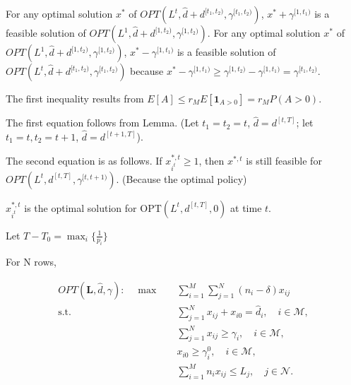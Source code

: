 For any optimal solution $x^{*}$ of $OPT(L^{t}, \hat{d}+d^{[t_1, t_2)}, \gamma^{[t_1, t_2)})$, $x^{*} + \gamma^{[1, t_1)}$ is a feasible solution of $OPT(L^{1}, \hat{d}+d^{[1, t_2)}, \gamma^{[1, t_2)})$. For any optimal solution $x^{*}$ of $OPT(L^{1}, \hat{d}+d^{[1, t_2)}, \gamma^{[1, t_2)})$, $x^{*}- \gamma^{[1, t_1)}$ is a feasible solution of $OPT(L^{t}, \hat{d}+d^{[t_1, t_2)}, \gamma^{[t_1, t_2)})$ because $x^{*}- \gamma^{[1, t_1)} \geq \gamma^{[1, t_{2})}- \gamma^{[1, t_1)} = \gamma^{[t_1, t_2)}$.


The first inequality results from $E[A] \leq r_{M} E[\bm{1}_{A>0}] = r_{M} P(A>0)$.

The first equation follows from Lemma. (Let $t_1 = t_2 = t$, $\hat{d} = d^{[t, T]}$; let $t_1 = t, t_2 = t+1$, $\hat{d} = d^{[t+1, T]}$).

The second equation is as follows. If $x_{i^{t}}^{*,t} \geq 1$, then $x^{*,t}$ is still feasible for $OPT(L^{t}, d^{[t, T]}, \gamma^{[t,t+1)})$. (Because the optimal policy)

$x_{i^{t}}^{*,t}$ is the optimal solution for $\text{OPT}(L^{t}, d^{[t, T]}, 0)$ at time $t$.

Let $T- T_{0} = \max_{i}\{\frac{1}{p_{i}}\}$


For N rows,

\begin{align*}
    OPT(\bm{L}, \hat{d}, \gamma): \quad \max \quad & \sum_{i = 1}^{M} \sum_{j = 1}^{N} (n_i - \delta) x_{ij} \\
    \text {s.t.} \quad & \sum_{j=1}^{N} x_{ij} + x_{i0} = \hat{d}_{i}, \quad i \in \mathcal{M},  \\ 
    & \sum_{j=1}^{N} x_{ij} \geq \gamma_{i}, \quad i \in \mathcal{M}, \\
    & x_{i0} \geq \gamma_{i}^{0}, \quad i \in \mathcal{M}, \\
    & \sum_{i=1}^{M} n_{i} x_{ij} \leq L_{j}, \quad j \in \mathcal{N}.
\end{align*}

